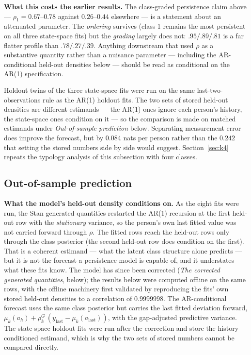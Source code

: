 \documentclass[11pt]{article}
\begin{document}
\textbf{What this costs the earlier results.} The class-graded persistence
claim above --- $\rho_1 = 0.67$--$0.78$ against $0.26$--$0.44$ elsewhere ---
is a statement about an attenuated parameter. The \emph{ordering} survives
(class 1 remains the most persistent on all three state-space fits) but the
\emph{grading} largely does not: $.95 / .89 / .81$ is a far flatter profile
than $.78 / .27 / .39$. Anything downstream that used $\rho$ as a
substantive quantity rather than a nuisance parameter --- including the
AR-conditional held-out densities below --- should be read as conditional on
the AR(1) specification.

Holdout twins of the three state-space fits were run on the same
last-two-observations rule as the AR(1) holdout fits. The two sets of stored
held-out densities are different estimands --- the AR(1) ones ignore each
person's history, the state-space ones condition on it --- so the comparison
is made on matched estimands under \emph{Out-of-sample prediction} below.
Separating measurement error does improve the forecast, but by $0.084$ nats
per person rather than the $0.242$ that setting the stored numbers side by
side would suggest. Section~\ref{sec:k4} repeats the typology analysis of this
subsection with four classes.

\subsection*{Out-of-sample prediction}

\textbf{What the model's held-out density conditions on.} As the eight fits
were run, the Stan generated quantities restarted the AR(1) recursion at the
first held-out row with the \emph{stationary} variance, so the person's own
last fitted value was not carried forward through $\rho$. The fitted rows reach the held-out
rows only through the class posterior (the second held-out row does condition
on the first). That is a coherent estimand --- what the latent class
structure alone predicts --- but it is not the forecast a persistence model
is capable of, and it understates what these fits know. The model has since
been corrected (\emph{The corrected generated quantities}, below); the results below were computed offline
on the same rows, with the offline machinery first validated by reproducing
the fits' own stored held-out densities to a correlation of $0.9999998$. The
AR-conditional forecast uses the same class posterior but carries the last
fitted deviation forward, $\mu_k(a_h) + \rho_k^{G}\,(y_{\text{last}} -
\mu_k(a_{\text{last}}))$, with the gap-adjusted predictive variance. The
state-space holdout fits were run after the correction and store the
history-conditioned estimand, which is why the two sets of stored numbers
cannot be compared directly.
\end{document}
